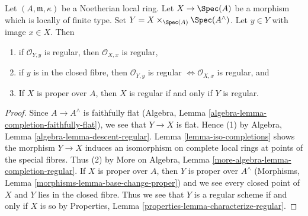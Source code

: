 \begin{lemma}
\label{lemma-port-regularity-to-completion}
Let $(A, \mathfrak m, \kappa)$ be a Noetherian local ring.
Let $X \to \Spec(A)$ be a morphism which is locally of finite type.
Set $Y = X \times_{\Spec(A)} \Spec(A^\wedge)$. Let $y \in Y$ with
image $x \in X$. Then
\begin{enumerate}
\item if $\mathcal{O}_{Y, y}$ is regular, then $\mathcal{O}_{X, x}$
is regular,
\item if $y$ is in the closed fibre, then $\mathcal{O}_{Y, y}$ is regular
$\Leftrightarrow \mathcal{O}_{X, x}$ is regular, and
\item If $X$ is proper over $A$, then $X$ is regular
if and only if $Y$ is regular.
\end{enumerate}
\end{lemma}

\begin{proof}
Since $A \to A^\wedge$ is faithfully flat
(Algebra, Lemma \ref{algebra-lemma-completion-faithfully-flat}),
we see that $Y \to X$ is flat. Hence (1) by
Algebra, Lemma \ref{algebra-lemma-descent-regular}.
Lemma \ref{lemma-iso-completions} shows the morphism $Y \to X$
induces an isomorphism on complete local rings at points
of the special fibres. Thus (2) by
More on Algebra, Lemma \ref{more-algebra-lemma-completion-regular}.
If $X$ is proper over $A$, then $Y$ is proper over $A^\wedge$
(Morphisms, Lemma \ref{morphisms-lemma-base-change-proper})
and we see every closed point of $X$ and $Y$ lies in the closed fibre.
Thus we see that $Y$ is a regular scheme if and only if $X$ is so by
Properties, Lemma \ref{properties-lemma-characterize-regular}.
\end{proof}
